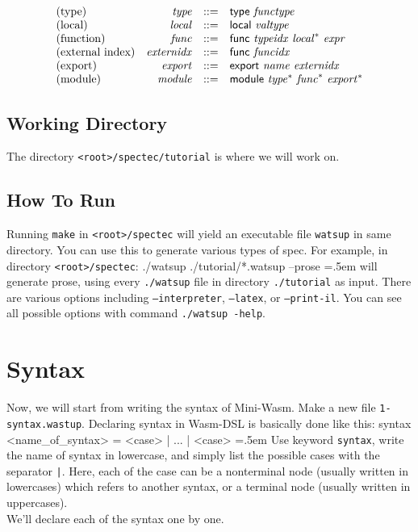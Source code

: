 \documentclass{article}
\newenvironment{lcverbatim}
 {\SaveVerbatim{cverb}}
 {\endSaveVerbatim
  \flushleft\fboxrule=0pt\fboxsep=.5em
  \colorbox{cverbbg}{%
    \makebox[\dimexpr\linewidth-2\fboxsep][l]{\BUseVerbatim{cverb}}%
  }
  \endflushleft
}
\newcommand\K[1]{\texttt{#1}}
\begin{document}
\vspace{1ex}

$$
\begin{array}{@{}lrrl@{}l@{}}
	\mbox{(type)} & {\mathit{type}} &::=& \mathsf{type}~{\mathit{functype}} \\
	\mbox{(local)} & {\mathit{local}} &::=& \mathsf{local}~{\mathit{valtype}} \\
	\mbox{(function)} & {\mathit{func}} &::=& \mathsf{func}~{\mathit{typeidx}}~{{\mathit{local}}^\ast}~{\mathit{expr}} \\
	\mbox{(external index)} & {\mathit{externidx}} &::=& \mathsf{func}~{\mathit{funcidx}} \\
	\mbox{(export)} & {\mathit{export}} &::=& \mathsf{export}~{\mathit{name}}~{\mathit{externidx}} \\
	\mbox{(module)} & {\mathit{module}} &::=& \mathsf{module}~{{\mathit{type}}^\ast}~{{\mathit{func}}^\ast}~{{\mathit{export}}^\ast} \\
\end{array}
$$

\subsection{Working Directory}
The directory \K{<root>/spectec/tutorial} is where we will work on.

\subsection{How To Run}
Running \K{make} in \K{<root>/spectec} will yield an executable file \K{watsup} in same directory. You can use this to generate various types of spec. For example, in directory \K{<root>/spectec}:
\begin{lcverbatim}
./watsup ./tutorial/*.watsup --prose
\end{lcverbatim}
will generate prose, using every \K{./watsup} file in directory \K{./tutorial} as input. There are various options including \K{--interpreter}, \K{--latex}, or \K{--print-il}. You can see all possible options with command \K{./watsup -help}.

\section{Syntax}
Now, we will start from writing the syntax of Mini-Wasm.
Make a new file \K{1-syntax.wastup}.
Declaring syntax in Wasm-DSL is basically done like this:
\begin{lcverbatim}
syntax <name_of_syntax> = <case> | ... | <case>
\end{lcverbatim}
Use keyword \K{syntax}, write the name of syntax in lowercase, and simply list the possible cases with the separator \K{|}. Here, each of the case can be a nonterminal node (usually written in lowercases) which refers to another syntax, or a terminal node (usually written in uppercases).\\
We'll declare each of the syntax one by one.
\end{document}
